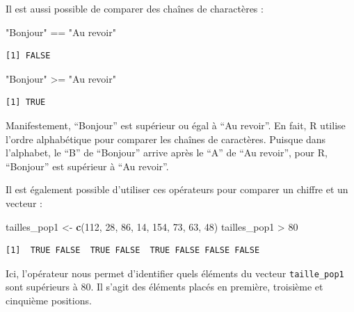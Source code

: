 \documentclass[
  a4paper,
]{article}
\newenvironment{Shaded}{\begin{snugshade}}{\end{snugshade}}
\newcommand{\DecValTok}[1]{\textcolor[rgb]{0.69,0.50,0.00}{#1}}
\newcommand{\KeywordTok}[1]{\textcolor[rgb]{0.12,0.11,0.11}{\textbf{#1}}}
\newcommand{\NormalTok}[1]{\textcolor[rgb]{0.12,0.11,0.11}{#1}}
\newcommand{\OperatorTok}[1]{\textcolor[rgb]{0.12,0.11,0.11}{#1}}
\newcommand{\StringTok}[1]{\textcolor[rgb]{0.75,0.01,0.01}{#1}}
\begin{document}
Il est aussi possible de comparer des chaînes de charactères :

\begin{Shaded}
\begin{Highlighting}[]
\StringTok{"Bonjour"} \OperatorTok{==}\StringTok{ "Au revoir"}
\end{Highlighting}
\end{Shaded}

\begin{verbatim}
[1] FALSE
\end{verbatim}

\begin{Shaded}
\begin{Highlighting}[]
\StringTok{"Bonjour"} \OperatorTok{>=}\StringTok{ "Au revoir"}
\end{Highlighting}
\end{Shaded}

\begin{verbatim}
[1] TRUE
\end{verbatim}

Manifestement, ``Bonjour'' est supérieur ou égal à ``Au revoir''. En fait, R utilise l'ordre alphabétique pour comparer les chaînes de caractères. Puisque dans l'alphabet, le ``B'' de ``Bonjour'' arrive après le ``A'' de ``Au revoir'', pour R, ``Bonjour'' est supérieur à ``Au revoir''.

Il est également possible d'utiliser ces opérateurs pour comparer un chiffre et un vecteur :

\begin{Shaded}
\begin{Highlighting}[]
\NormalTok{tailles_pop1 <-}\StringTok{ }\KeywordTok{c}\NormalTok{(}\DecValTok{112}\NormalTok{, }\DecValTok{28}\NormalTok{, }\DecValTok{86}\NormalTok{, }\DecValTok{14}\NormalTok{, }\DecValTok{154}\NormalTok{, }\DecValTok{73}\NormalTok{, }\DecValTok{63}\NormalTok{, }\DecValTok{48}\NormalTok{)}
\NormalTok{tailles_pop1 }\OperatorTok{>}\StringTok{ }\DecValTok{80}
\end{Highlighting}
\end{Shaded}

\begin{verbatim}
[1]  TRUE FALSE  TRUE FALSE  TRUE FALSE FALSE FALSE
\end{verbatim}

Ici, l'opérateur nous permet d'identifier quels éléments du vecteur \texttt{taille\_pop1} sont supérieurs à 80. Il s'agit des éléments placés en première, troisième et cinquième positions.
\end{document}
